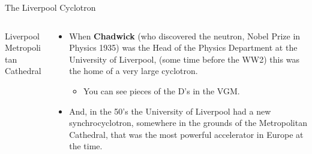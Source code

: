 \begin{frame}{The Liverpool Cyclotron}
\begin{columns}
\begin{column}{0.25\textwidth}
\begin{center}
       {\scriptsize  Liverpool Metropolitan Cathedral}\\
     \end{center}
  \end{column}
  \begin{column}{0.75\textwidth}
     \begin{itemize}
          \item When {\bf Chadwick} (who discovered the neutron, Nobel Prize in Physics 1935)
                    was the Head of the Physics Department at the University of Liverpool,
                    (some time before the WW2) this was the home of a very large cyclotron.
            \vspace{0.1cm}
            \begin{itemize}
                 \item You can see pieces of the D's in the VGM.
            \end{itemize}
          \vspace{0.3cm}
          \item And, in the 50's the University of Liverpool had a new synchrocyclotron, somewhere in the grounds of the
                   Metropolitan Cathedral, that was the most powerful accelerator in Europe at the time.\\
     \end{itemize}
  \end{column}
\end{columns}

\end{frame}


%
%
%


